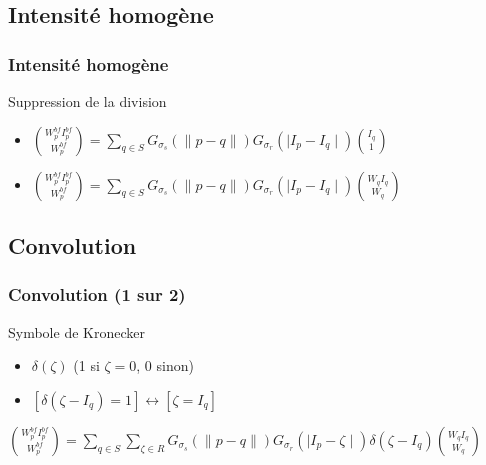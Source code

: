 \documentclass[compress]{beamer}
\begin{document}
\subsection{Intensité homogène}
\begin{frame}\frametitle{Intensité homogène}
	\begin{block}{Suppression de la division}
		\begin{itemize}
			\item $\binom{W_p^{bf} I_p^{bf}}{W_p^{bf}} = \sum_{q\in S} G_{\sigma_s}(\parallel p- q \parallel)G_{\sigma_r}(\mid I_p - I_q \mid) \binom{I_q}{1}$
			\item $\binom{W_p^{bf} I_p^{bf}}{W_p^{bf}} = \sum_{q\in S} G_{\sigma_s}(\parallel p- q \parallel)G_{\sigma_r}(\mid I_p - I_q \mid) \binom{W_q I_q}{W_q}$
			
		\end{itemize}
	\end{block}
\end{frame}

\subsection{Convolution}
\begin{frame}\frametitle{Convolution (1 sur 2)}
	\begin{block}{Symbole de Kronecker}
		\begin{itemize}
			\item $\delta(\zeta)$ (1 si $\zeta = 0$, 0 sinon)
			\item $[\delta(\zeta-I_q)=1] \leftrightarrow [\zeta = I_q]$
		\end{itemize}
	\end{block}
	$\binom{W_p^{bf} I_p^{bf}}{W_p^{bf}} = \sum_{q\in S}\sum_{\zeta\in R} G_{\sigma_s}(\parallel p- q \parallel)G_{\sigma_r}(\mid I_p - \zeta \mid)\delta(\zeta-I_q) \binom{W_q I_q}{W_q}$
	
\end{frame}
\end{document}

